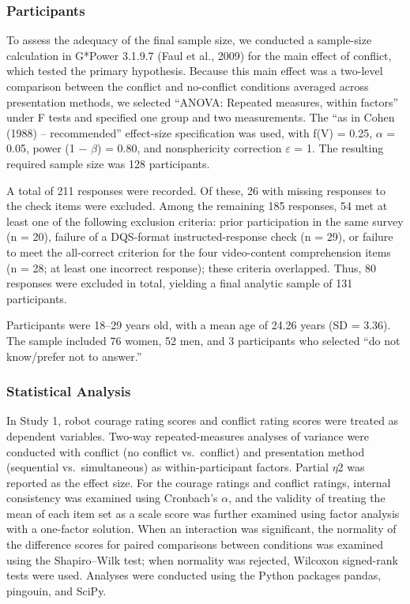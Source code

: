 \documentclass[utf8]{FrontiersinHarvard}
\begin{document}
\subsubsection{Participants}\label{participants}

To assess the adequacy of the final sample size, we conducted a sample-size calculation in G*Power 3.1.9.7 (Faul et al., 2009) for the main effect of conflict, which tested the primary hypothesis. Because this main effect was a two-level comparison between the conflict and no-conflict conditions averaged across presentation methods, we selected ``ANOVA: Repeated measures, within factors'' under F tests and specified one group and two measurements. The ``as in Cohen (1988) -- recommended'' effect-size specification was used, with f(V) = 0.25, $\alpha$ = 0.05, power (1 $-$ $\beta$) = 0.80, and nonsphericity correction $\varepsilon$ = 1. The resulting required sample size was 128 participants.

A total of 211 responses were recorded. Of these, 26 with missing responses to the check items were excluded. Among the remaining 185 responses, 54 met at least one of the following exclusion criteria: prior participation in the same survey (n = 20), failure of a DQS-format instructed-response check (n = 29), or failure to meet the all-correct criterion for the four video-content comprehension items (n = 28; at least one incorrect response); these criteria overlapped. Thus, 80 responses were excluded in total, yielding a final analytic sample of 131 participants.

Participants were 18--29 years old, with a mean age of 24.26 years (SD = 3.36). The sample included 76 women, 52 men, and 3 participants who selected ``do not know/prefer not to answer.''

\subsubsection{Statistical Analysis}\label{statistical-analysis}

In Study 1, robot courage rating scores and conflict rating scores were treated as dependent variables. Two-way repeated-measures analyses of variance were conducted with conflict (no conflict vs.~conflict) and presentation method (sequential vs.~simultaneous) as within-participant factors. Partial $\eta$2 was reported as the effect size. For the courage ratings and conflict ratings, internal consistency was examined using Cronbach's $\alpha$, and the validity of treating the mean of each item set as a scale score was further examined using factor analysis with a one-factor solution. When an interaction was significant, the normality of the difference scores for paired comparisons between conditions was examined using the Shapiro--Wilk test; when normality was rejected, Wilcoxon signed-rank tests were used. Analyses were conducted using the Python packages pandas, pingouin, and SciPy.
\end{document}
